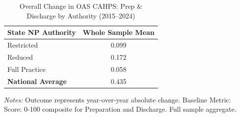 \begin{table}[htbp]
    \centering
    \caption{Overall Change in OAS CAHPS: Prep \& Discharge by Authority (2015--2024)}
    \label{tab:d_oas_grp3_full}
    \vspace{0.2cm}
    \begin{tabular}{lc}
        \toprule
        \textbf{State NP Authority} & \textbf{Whole Sample Mean} \\
        \midrule
        Restricted & 0.099 \\
        Reduced & 0.172 \\
        Full Practice & 0.058 \\
        \midrule
        \textbf{National Average} & 0.435 \\
        \bottomrule
    \end{tabular}
    \vspace{0.1cm}
    \begin{minipage}{0.6\textwidth}
        \footnotesize \textit{Notes:} Outcome represents year-over-year absolute change. Baseline Metric: Score: 0-100 composite for Preparation and Discharge. Full sample aggregate.
    \end{minipage}
\end{table}